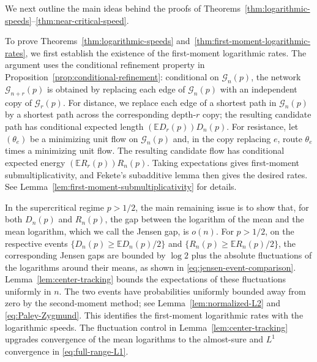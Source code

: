 \documentclass[12pt]{amsart}
\numberwithin{equation}{section}
\theoremstyle{plain}
\theoremstyle{definition}
\newcommand{\E}{\mathbb E}
\begin{document}
We next outline the main ideas behind the proofs of
Theorems~\ref{thm:logarithmic-speeds}--\ref{thm:near-critical-speed}.

To prove Theorems~\ref{thm:logarithmic-speeds}
and~\ref{thm:first-moment-logarithmic-rates}, we first establish the
existence of the first-moment logarithmic rates.  The argument uses the conditional refinement property in
Proposition~\ref{prop:conditional-refinement}: conditional on
$\mathcal G_n(p)$, the network $\mathcal G_{n+r}(p)$ is obtained by replacing
each edge of $\mathcal G_n(p)$ with an independent copy of $\mathcal G_r(p)$.  For
distance, we replace each edge of a shortest path in $\mathcal G_n(p)$ by a
shortest path across the corresponding depth-$r$ copy; the resulting
candidate path has conditional expected length
$(\E D_r(p))D_n(p)$.  For resistance, let $(\theta_e)$ be a minimizing unit
flow on $\mathcal G_n(p)$ and, in the copy replacing $e$, route $\theta_e$
times a minimizing unit flow.  The resulting candidate flow has conditional
expected energy $(\E R_r(p))R_n(p)$.  Taking expectations gives first-moment
submultiplicativity, and Fekete's subadditive lemma then gives the desired rates.  See
Lemma~\ref{lem:first-moment-submultiplicativity} for details.

In the supercritical regime $p>1/2$, the main remaining issue is to show that, for both
$D_n(p)$ and $R_n(p)$, the gap between the logarithm of the mean and the mean
logarithm, which we call the Jensen gap, is $o(n)$. For $p>1/2$, on the respective events
$\{D_n(p)\ge\E D_n(p)/2\}$ and $\{R_n(p)\ge\E R_n(p)/2\}$, the corresponding
Jensen gaps are bounded by $\log2$ plus the absolute fluctuations of the
logarithms around their means, as shown in
\eqref{eq:jensen-event-comparison}.  Lemma~\ref{lem:center-tracking} bounds
the expectations of these fluctuations uniformly in $n$.  The two events
have probabilities uniformly bounded away from zero by the second-moment
method; see Lemma~\ref{lem:normalized-L2} and
\eqref{eq:Paley-Zygmund}.  This identifies the first-moment logarithmic rates
with the logarithmic speeds.
The fluctuation control in Lemma~\ref{lem:center-tracking} upgrades convergence of the mean logarithms
to the almost-sure and $L^1$ convergence in \eqref{eq:full-range-L1}.
\end{document}
